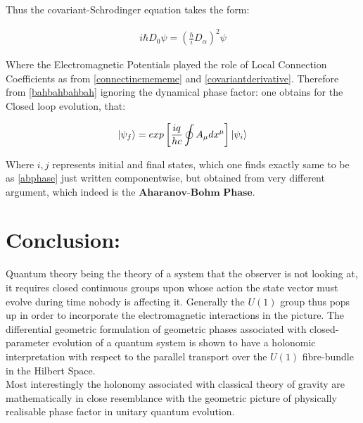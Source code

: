 \documentclass[8pt, twocoloumn]{article}
\begin{document}
Thus the covariant-Schrodinger equation takes the form:

\begin{align}
    i\hbar D_0 \psi = {(\frac{\hbar}{i} D_{\alpha})}^{2}\psi
\end{align}

Where the Electromagnetic Potentials played the role of Local Connection Coefficients as from \ref{connectinemememe} and \ref{covariantderivative}. Therefore from \ref{bahbahbahbah} ignoring the dynamical phase factor: one obtains for the Closed loop evolution, that:


\begin{align}
    \ket{\psi_f} = exp \left[ \frac{iq}{hc} \oint A_{\mu}dx^{\mu} \right] \ket{\psi_i}
\end{align}

Where $i, j$ represents initial and final states, which one finds exactly same to be as \ref{abphase} just written componentwise, but obtained from very different argument, which indeed is the $\textbf{Aharanov-Bohm Phase}$.


    


\section{Conclusion:}

Quantum theory being the theory of a system that the observer is not looking at, it requires closed continuous groups upon whose action the state vector must evolve during time nobody is affecting it. Generally the $U(1)$ group thus pops up in order to incorporate the electromagnetic interactions in the picture. The differential geometric formulation of geometric phases associated with closed-parameter evolution of a quantum system is shown to have a holonomic interpretation with respect to the parallel transport over the $U(1)$ fibre-bundle in the Hilbert Space. \\
Most interestingly the holonomy associated with classical theory of gravity are mathematically in close resemblance with the geometric picture of physically realisable phase factor in unitary quantum evolution. 



\end{document}
